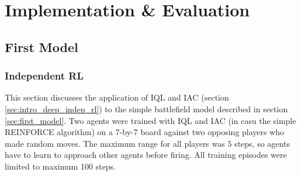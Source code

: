\chapter{Implementation \& Evaluation}
\label{ch:impl_eval}

\section{First Model}
\subsection{Independent RL}
\label{sec:iql_applied}
This section discusses the application of IQL and IAC (section \ref{sec:intro_deep_indep_rl}) to the simple battlefield model described in section \ref{sec:first_model}. Two agents were trained with IQL and IAC (in casu the simple REINFORCE algorithm) on a 7-by-7 board against two opposing players who made random moves. The maximum range for all players was $5$ steps, so agents have to learn to approach other agents before firing. All training episodes were limited to maximum 100 steps.\\

